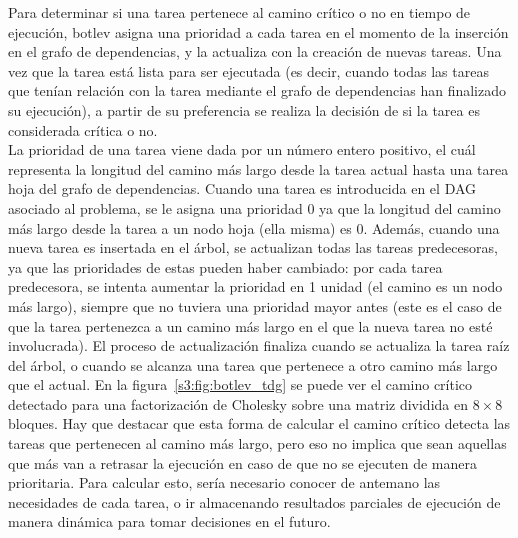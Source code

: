 Para determinar si una tarea pertenece al camino crítico o no en tiempo de
ejecución, botlev asigna una prioridad a cada tarea en el momento de la
inserción en el grafo de dependencias, y la actualiza con la creación de
nuevas tareas. Una vez que la tarea está lista para ser ejecutada (es
decir, cuando todas las tareas que tenían relación con la tarea mediante el
grafo de dependencias han finalizado su ejecución), a partir de su
preferencia se realiza la decisión de si la tarea es considerada crítica o no.\\
La prioridad de una tarea viene dada por un número entero positivo, el cuál
representa la longitud del camino más largo desde la tarea actual hasta una
tarea hoja del grafo de dependencias. Cuando una tarea es introducida en el
DAG asociado al problema, se le asigna una prioridad 0 ya que la longitud
del camino más largo desde la tarea a un nodo hoja (ella misma) es
0. Además, cuando una nueva tarea es insertada en el árbol, se actualizan
todas las tareas predecesoras, ya que las prioridades de estas pueden haber
cambiado: por cada tarea predecesora, se intenta aumentar la prioridad en 1
unidad (el camino es un nodo más largo), siempre que no tuviera una
prioridad mayor antes (este es el caso de que la tarea pertenezca a un
camino más largo en el que la nueva tarea no esté involucrada). El proceso
de actualización finaliza cuando se actualiza la tarea raíz del árbol, o
cuando se alcanza una tarea que pertenece a otro camino más largo que el
actual. En la figura~\ref{s3:fig:botlev_tdg} se puede ver el camino crítico
detectado para una factorización de Cholesky sobre una matriz dividida en
$8\times8$ bloques. Hay que destacar que esta forma de calcular el camino
crítico detecta las tareas que pertenecen al camino más largo, pero eso no
implica que sean aquellas que más van a retrasar la ejecución en caso de
que no se ejecuten de manera prioritaria. Para calcular esto, sería
necesario conocer de antemano las necesidades de cada tarea, o ir
almacenando resultados parciales de ejecución de manera dinámica para tomar
decisiones en el futuro.

